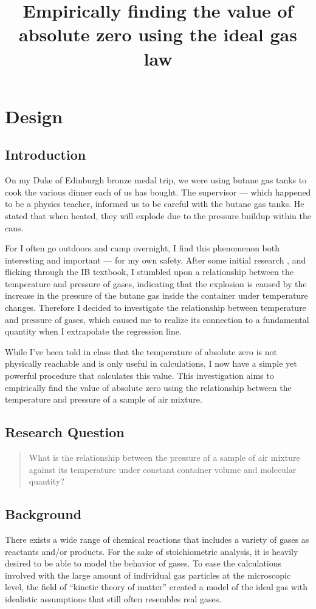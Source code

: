 \documentclass[a4paper,12pt]{article}
\title{Empirically finding the value of absolute zero using the ideal gas law}
\author{}
\date{\vspace{-8ex}}
\begin{document}
\maketitle

\section{Design}
\subsection{Introduction}
On my Duke of Edinburgh bronze medal trip, we were using butane gas tanks to cook the various dinner each of us has bought. The supervisor --- which happened to be a physics teacher, informed us to be careful with the butane gas tanks. He stated that when heated, they will explode due to the pressure buildup within the cans.

For I often go outdoors and camp overnight, I find this phenomenon both interesting and important --- for my own safety. After some initial research \parencite{lpg}, and flicking through the IB textbook, I stumbled upon a relationship between the temperature and pressure of gases, indicating that the explosion is caused by the increase in the pressure of the butane gas inside the container under temperature changes. Therefore I decided to investigate the relationship between temperature and pressure of gases, which caused me to realize its connection to a fundamental quantity when I extrapolate the regression line.

While I've been told in class that the temperature of absolute zero is not physically reachable and is only useful in calculations, I now have a simple yet powerful procedure that calculates this value. This investigation aims to empirically find the value of absolute zero using the relationship between the temperature and pressure of a sample of air mixture.


\subsection{Research Question}
\begin{quote}
    What is the relationship between the pressure of a sample of air mixture against its temperature under constant container volume and molecular quantity?
\end{quote}

\subsection{Background}
There exists a wide range of chemical reactions that includes a variety of gases as reactants and/or products. For the sake of stoichiometric analysis, it is heavily desired to be able to model the behavior of gases. To ease the calculations involved with the large amount of individual gas particles at the microscopic level, the field of ``kinetic theory of matter'' created a model of the ideal gas with idealistic assumptions that still often resembles real gases.
\end{document}
